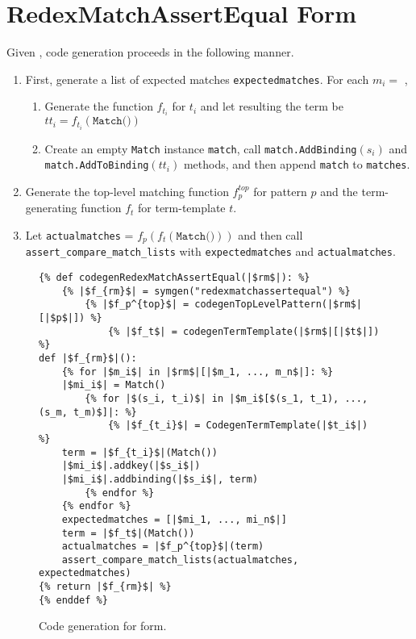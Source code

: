 \section{RedexMatchAssertEqual Form}
Given \RedexMatchAssertEqual, code generation proceeds in the following manner.

\begin{enumerate}
\item First, generate a list of expected matches \texttt{expectedmatches}. For each $m_i =$ \Match,
\begin{enumerate}
\item Generate the function $f_{t_i}$ for $t_i$ and let resulting the term be $tt_i = f_{t_i}(\texttt{Match()})$
\item Create an empty \texttt{Match} instance \texttt{match}, call \texttt{match.AddBinding}$(s_i)$ and \newline \texttt{match.AddToBinding}$(tt_i)$ methods, and then append \texttt{match} to \texttt{matches}.
\end{enumerate}
\item Generate the top-level matching function $f_p^{top}$ for pattern $p$ and the term-generating function $f_t$ for term-template $t$.
\item Let \texttt{actualmatches} = $f_p(f_t(\texttt{Match()}))$ and then call \texttt{assert\_compare\_match\_lists} with \texttt{expectedmatches} and \texttt{actualmatches}.
\end{enumerate}

\begin{figure}[h]
\begin{verbatim}
{% def codegenRedexMatchAssertEqual(|$rm$|): %}
	{% |$f_{rm}$| = symgen("redexmatchassertequal") %}
		{% |$f_p^{top}$| = codegenTopLevelPattern(|$rm$|[|$p$|]) %}
			{% |$f_t$| = codegenTermTemplate(|$rm$|[|$t$|]) %}
def |$f_{rm}$|():
	{% for |$m_i$| in |$rm$|[|$m_1, ..., m_n$|]: %}
	|$mi_i$| = Match()
		{% for |$(s_i, t_i)$| in |$m_i$[$(s_1, t_1), ..., (s_m, t_m)$]|: %}
			{% |$f_{t_i}$| = CodegenTermTemplate(|$t_i$|) %}
	term = |$f_{t_i}$|(Match())
	|$mi_i$|.addkey(|$s_i$|)
	|$mi_i$|.addbinding(|$s_i$|, term)
		{% endfor %}
	{% endfor %}
	expectedmatches = [|$mi_1, ..., mi_n$|]
	term = |$f_t$|(Match())
	actualmatches = |$f_p^{top}$|(term)
	assert_compare_match_lists(actualmatches, expectedmatches)
{% return |$f_{rm}$| %}
{% enddef %}
\end{verbatim}
\caption{Code generation for \RedexMatchAssertEqualNoArgs \space form.}
\label{codegen-redexmatch}
\end{figure}

